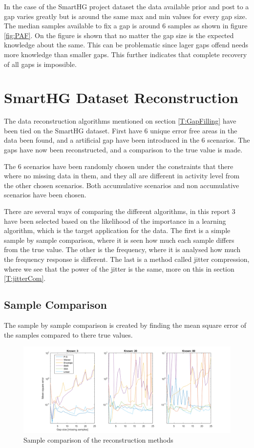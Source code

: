 In the case of the SmartHG project dataset the data available prior and post to a gap varies greatly but is around the same max and min values for every gap size. The median samples available to fix a gap is around 6 samples as shown in figure \ref{fig:PAF}. On the figure is shown that no matter the gap size is the expected knowledge about the same. This can be problematic since lager gaps offend needs more knowledge than smaller gaps. This further indicates that complete recovery of all gaps is impossible. 

\section{SmartHG Dataset Reconstruction}
The data reconstruction algorithms mentioned on section \ref{T:GapFilling} have been tied on the SmartHG dataset. First have 6 unique error free areas in the data been found, and a artificial gap have been introduced in the 6 scenarios. 
The gaps have now been reconstructed, and a comparison to the true value is made. 

The 6 scenarios have been randomly chosen under the constraints that there where no missing data in them, and they all are different in activity level from the other chosen scenarios. Both accumulative scenarios and non accumulative scenarios have been chosen. 

There are several ways of comparing the different algorithms, in this report 3 have been selected based on the likelihood of the importance in a learning algorithm, which is the target application for the data. The first is a simple sample by sample comparison, where it is seen how much each sample differs from the true value. The other is the frequency, where it is analysed how much the frequency response is different. The last is a method called jitter compression, where we see that the power of the jitter is the same, more on this in section \ref{T:jitterCom}.

\subsection{Sample Comparison}
The sample by sample comparison is created by finding the mean square error of the samples compared to there true values.  

\begin{figure}[H]
\centering
\includegraphics[width=1\textwidth]{billeder/RecNorm.png}
\caption{Sample comparison of the reconstruction methods}
\label{fig:RecNorm}
\end{figure}

